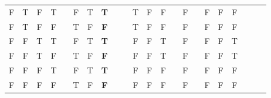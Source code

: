 \begin{enumerate}
\begin{tabular}{@{ }c@{ }@{ }c@{ }@{ }c@{ }@{ }c | c@{ }@{ }c@{ }@{ }c@{ }@{ }c@{ }@{}c@{}@{}c@{}@{ }c@{ }@{ }c@{ }@{ }c@{ }@{}c@{}@{ }c@{ }@{}c@{}@{ }c@{ }@{ }c@{ }@{ }c@{ }@{}c@{}@{}c@{}@{ }c}
		      F & T & F & T &  & F       & T & \textbf{T}    &   &   & T & F       & F &   & F       &   & F & F       & F &   &   & \\
		      F & T & F & F &  & T       & F & \textbf{F}    &   &   & T & F       & F &   & F       &   & F & F       & F &   &   & \\
		      F & F & T & T &  & F       & T & \textbf{T}    &   &   & F & F       & T &   & F       &   & F & F       & T &   &   & \\
		      F & F & T & F &  & T       & F & \textbf{F}    &   &   & F & F       & T &   & F       &   & F & F       & T &   &   & \\
		      F & F & F & T &  & F       & T & \textbf{T}    &   &   & F & F       & F &   & F       &   & F & F       & F &   &   & \\
		      F & F & F & F &  & T       & F & \textbf{F}    &   &   & F & F       & F &   & F       &   & F & F       & F &   &   & \\
	      \end{tabular}


\end{enumerate}
